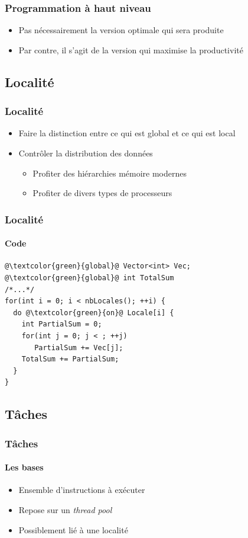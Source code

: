 \documentclass{beamer}
\begin{document}
\begin{frame}
\frametitle{Programmation à haut niveau}
\begin{itemize}
\item Pas nécessairement la version optimale qui sera produite
\item Par contre, il s'agit de la version qui maximise la productivité
\end{itemize}
\end{frame}

\subsection{Localité}
\begin{frame}
\frametitle{Localité}
\begin{itemize}
\item Faire la distinction entre ce qui est global et ce qui est local
\item Contrôler la distribution des données
\begin{itemize}
\item<2-> Profiter des hiérarchies mémoire modernes
\item<2-> Profiter de divers types de processeurs
\end{itemize}
\end{itemize}
\end{frame}

\begin{frame}[fragile]
\frametitle{Localité}
\framesubtitle{Code}
\begin{lstlisting}
@\textcolor{green}{global}@ Vector<int> Vec;
@\textcolor{green}{global}@ int TotalSum
/*...*/
for(int i = 0; i < nbLocales(); ++i) {
  do @\textcolor{green}{on}@ Locale[i] {
    int PartialSum = 0;
    for(int j = 0; j < ; ++j)
       PartialSum += Vec[j];
    TotalSum += PartialSum;
  }
}
\end{lstlisting}
\end{frame}

\subsection{Tâches}
\begin{frame}
\frametitle{Tâches}
\framesubtitle{Les bases}
\begin{itemize}
\item Ensemble d'instructions à exécuter
\item Repose sur un \textit{thread pool}
\item Possiblement lié à une localité
\end{itemize}
\end{frame}
\end{document}
